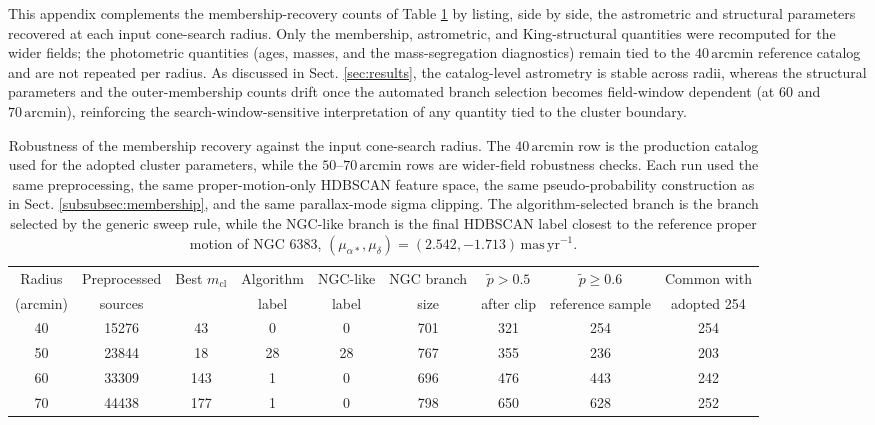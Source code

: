 \documentclass{aa}
\begin{document}
\begin{appendix}
This appendix complements the membership-recovery counts of Table \ref{tab:cone_robustness} by listing, side by side, the astrometric and structural parameters recovered at each input cone-search radius. Only the membership, astrometric, and King-structural quantities were recomputed for the wider fields; the photometric quantities (ages, masses, and the mass-segregation diagnostics) remain tied to the $40\,\mathrm{arcmin}$ reference catalog and are not repeated per radius. As discussed in Sect. \ref{sec:results}, the catalog-level astrometry is stable across radii, whereas the structural parameters and the outer-membership counts drift once the automated branch selection becomes field-window dependent (at $60$ and $70\,\mathrm{arcmin}$), reinforcing the search-window-sensitive interpretation of any quantity tied to the cluster boundary.

\begin{table}
		\caption{Robustness of the membership recovery against the input cone-search radius. The $40\,\mathrm{arcmin}$ row is the production catalog used for the adopted cluster parameters, while the $50$--$70\,\mathrm{arcmin}$ rows are wider-field robustness checks. Each run used the same preprocessing, the same proper-motion-only HDBSCAN feature space, the same pseudo-probability construction as in Sect. \ref{subsubsec:membership}, and the same parallax-mode sigma clipping. The algorithm-selected branch is the branch selected by the generic sweep rule, while the NGC-like branch is the final HDBSCAN label closest to the reference proper motion of NGC 6383, $(\mu_{\alpha*},\mu_{\delta})=(2.542,-1.713)\,\mathrm{mas\,yr^{-1}}$.}
	\centering
	\begin{tabular}{ccccccccc}
		\hline
		Radius & Preprocessed & Best $m_\mathrm{cl}$ & Algorithm & NGC-like & NGC branch & $\tilde{p}>0.5$ & $\tilde{p}\geq0.6$ & Common with \\
		(arcmin) & sources &  & label & label & size & after clip & reference sample & adopted 254 \\
		\hline
		40 & 15276 & 43  & 0  & 0  & 701 & 321 & 254 & 254 \\
		50 & 23844 & 18  & 28 & 28 & 767 & 355 & 236 & 203 \\
		60 & 33309 & 143 & 1  & 0  & 696 & 476 & 443 & 242 \\
		70 & 44438 & 177 & 1  & 0  & 798 & 650 & 628 & 252 \\
		\hline
	\end{tabular}
	\label{tab:cone_robustness}
\end{table}


\end{appendix}
\end{document}
